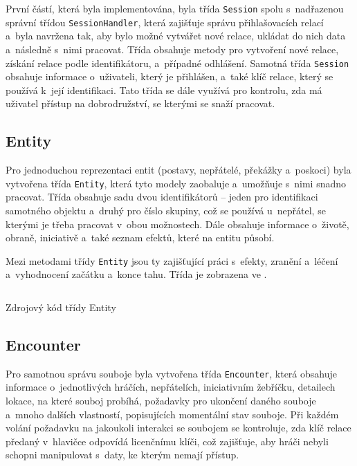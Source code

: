První částí, která byla implementována, byla třída \texttt{Session} spolu s~nadřazenou správní třídou \texttt{SessionHandler}, která zajišťuje správu přihlašovacích relací a~byla navržena tak, aby bylo možné vytvářet nové relace, ukládat do nich data a~následně s~nimi pracovat. Třída obsahuje metody pro vytvoření nové relace, získání relace podle identifikátoru, a~případné odhlášení. Samotná třída \texttt{Session} obsahuje informace o~uživateli, který je přihlášen, a~také klíč relace, který se používá k~její identifikaci. Tato třída se dále využívá pro kontrolu, zda má uživatel přístup na dobrodružství, se kterými se snaží pracovat.


\subsection{Entity}
\label{subsec:impl_entity}

Pro jednoduchou reprezentaci entit (postavy, nepřátelé, překážky a~poskoci) byla vytvořena třída \texttt{Entity}, která tyto modely zaobaluje a~umožňuje s~nimi snadno pracovat. Třída obsahuje sadu dvou identifikátorů -- jeden pro identifikaci samotného objektu a~druhý pro číslo skupiny, což se používá u~nepřátel, se kterými je třeba pracovat v~obou možnostech. Dále obsahuje informace o~životě, obraně, iniciativě a~také seznam efektů, které na entitu působí.

Mezi metodami třídy \texttt{Entity} jsou ty zajišťující práci s~efekty, zranění a~léčení a~vyhodnocení začátku a~konce tahu. Třída je zobrazena ve .

\begin{listing}[H]
    \inputminted{Java}{code/EncounterEntity.java}
    \caption{Zdrojový kód třídy Entity}
    \label{code:entity}
\end{listing}


\subsection{Encounter}
\label{subsec:impl_encounter}

Pro samotnou správu souboje byla vytvořena třída \texttt{Encounter}, která obsahuje informace o~jednotlivých hráčích, nepřátelích, iniciativním žebříčku, detailech lokace, na které souboj probíhá, požadavky pro ukončení daného souboje a~mnoho dalších vlastností, popisujících momentální stav souboje. Při každém volání požadavku na jakoukoli interakci se soubojem se kontroluje, zda klíč relace předaný v~hlavičce odpovídá licenčnímu klíči, což zajišťuje, aby hráči nebyli schopni manipulovat s~daty, ke kterým nemají přístup. 

